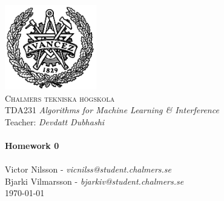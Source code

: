 
\begin{titlepage}
\begin{center}


~\\[1.0cm]
 \includegraphics[width=0.3\textwidth]{Figures/chalmers.png}~\\[1.0cm]

\textsc{\LARGE Chalmers tekniska högskola}\\[0.3cm]
TDA231 \textit{Algorithms for Machine Learning \& Interference}\\
Teacher: \textit{Devdatt Dubhashi} \\

\HRule \\[0.3cm]
{ \huge \bfseries Homework 0 \\[0.3cm] }
\HRule \\[0.3cm]

Victor Nilsson  -  \textit{vicnilss@student.chalmers.se}\\ [0.3cm]
Bjarki Vilmarsson  -  \textit{bjarkiv@student.chalmers.se}\\ [0.3cm]


\vfill
{\large \today}

\end{center}
\end{titlepage}

\newpage